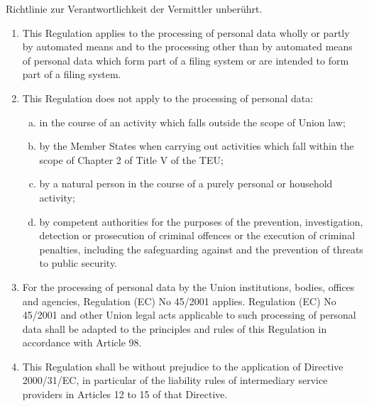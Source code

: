 {\begin{agreement}[0.5]
{\begin{enumerate}[(1)]
          Richtlinie zur Verantwortlichkeit der Vermittler unberührt.
      \end{enumerate}
    }{
      \begin{enumerate}[(1)]
        \item This Regulation applies to the processing of personal data wholly
          or partly by automated means and to the processing other than by
          automated means of personal data which form part of a filing system or
          are intended to form part of a filing system.
        \item This Regulation does not apply to the processing of personal data:
          \begin{enumerate}[a)]
            \item in the course of an activity which falls outside the scope of Union law;
            \item by the Member States when carrying out activities which fall
              within the scope of Chapter 2 of Title V of the TEU;
            \item by a natural person in the course of a purely personal or
              household activity;
            \item by competent authorities for the purposes of the prevention,
              investigation, detection or prosecution of criminal offences or the
              execution of criminal penalties, including the safeguarding against
              and the prevention of threats to public security.
          \end{enumerate}
        \item For the processing of personal data by the Union institutions,
          bodies, offices and agencies, Regulation (EC) No 45/2001 applies.
          Regulation (EC) No 45/2001 and other Union legal acts applicable to
          such processing of personal data shall be adapted to the principles and
          rules of this Regulation in accordance with Article 98.
        \item This Regulation shall be without prejudice to the application of
          Directive 2000/31/EC, in particular of the liability rules of
          intermediary service providers in Articles 12 to 15 of that Directive.
      \end{enumerate}
    }
  \end{agreement}
}


